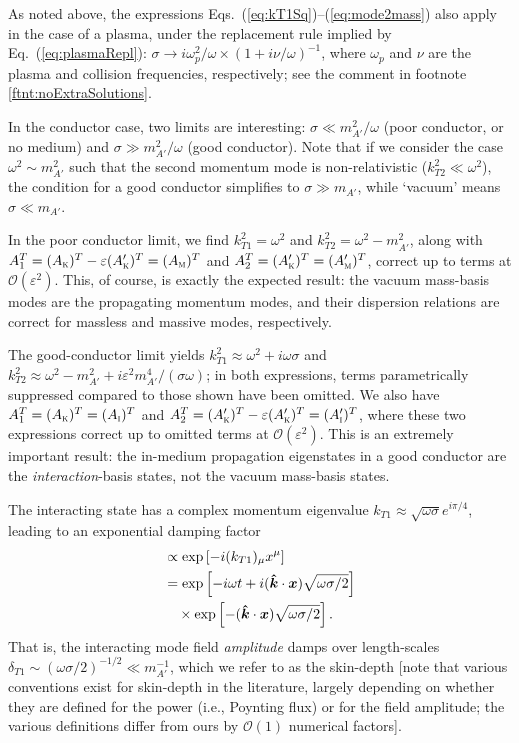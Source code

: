 \documentclass[amsmath,amssymb,aps,10pt,prd,letterpaper,nofootinbib,balancelastpage,notitlepage,superscriptaddress,twocolumn,floatfix]{revtex4-2}
\renewcommand{\eqref}[2][]{Eq{#1}.~(\ref{eq:#2})}	%
\newcommand{\eqrefRange}[2]{Eqs.~(\ref{eq:#1})--(\ref{eq:#2})}
\newcommand{\lb}{\ensuremath{\left}}					%
\newcommand{\rb}{\ensuremath{\right}}					%
\newcommand{\nl}{\nonumber \\ & \quad }					%
\newcommand{\kin}[1]{({#1}_{\textsc{k}})}
\newcommand{\primekin}[1]{({#1}_{\textsc{k}}^\prime)}
\newcommand{\mass}[1]{({#1}_{\textsc{m}})}
\newcommand{\primemass}[1]{({#1}_{\textsc{m}}^\prime)}
\newcommand{\inter}[1]{({#1}_{\textsc{i}})}
\newcommand{\primeinter}[1]{({#1}_{\textsc{i}}^\prime)}
\begin{document}
As noted above, the expressions \eqrefRange{kT1Sq}{mode2mass} also apply in the case of a plasma, under the replacement rule implied by \eqref{plasmaRepl}: $\sigma \rightarrow i \omega_p^2/\omega \times ( 1+i\nu/\omega )^{-1}$, where $\omega_p$ and $\nu$ are the plasma and collision frequencies, respectively; see the comment in footnote \ref{ftnt:noExtraSolutions}.

In the conductor case, two limits are interesting: $\sigma\ll m_{A'}^2/\omega $ (poor conductor, or no medium) and $\sigma \gg m_{A'}^2 / \omega$ (good conductor).
Note that if we consider the case $\omega^2 \sim m_{A'}^2$ such that the second momentum mode is non-relativistic ($k_{T2}^2 \ll \omega^2$), the condition for a good conductor simplifies to $\sigma \gg m_{A'}$, while `vacuum' means $\sigma \ll m_{A'}$.

In the poor conductor limit, we find $k_{T1}^2 = \omega^2$ and $k_{T2}^2 = \omega^2-m_{A'}^2$, along with $A_{1}^T = \kin{A}^T - \varepsilon \primekin{A}^T = \mass{A}^T$ and $A_{2}^T = \primekin{A}^T = \primemass{A}^T$, correct up to terms at $\mathcal{O}(\varepsilon^2)$.
This, of course, is exactly the expected result: the vacuum mass-basis modes are the propagating momentum modes, and their dispersion relations are correct for massless and massive modes, respectively.

The good-conductor limit yields $k_{T1}^2 \approx \omega^2 + i \omega \sigma$ and $k_{T2}^2 \approx \omega^2 - m_{A'}^2 + i \varepsilon^2 m_{A'}^4/(\sigma \omega)$; in both expressions, terms parametrically suppressed compared to those shown have been omitted.
We also have $A_{1}^T = \kin{A}^T = \inter{A}^T$ and $A_{2}^T = \primekin{A}^T - \varepsilon \primekin{A}^T = \primeinter{A}^T$, where these two expressions correct up to omitted terms at $\mathcal{O}(\varepsilon^2)$.
This is an extremely important result: the in-medium propagation eigenstates in a good conductor are the \emph{interaction}-basis states, not the vacuum mass-basis states.

The interacting state has a complex momentum eigenvalue $k_{T1} \approx \sqrt{\omega \sigma} e^{i\pi/4}$, leading to an exponential damping factor
\begin{align}
&\propto \exp\lb[- i (k_{T1})_\mu x^\mu\rb] \nonumber\\
&= \exp\lb[ - i\omega t + i (\bm{\hat{k}} \cdot \bm{x}) \sqrt{\omega \sigma / 2} \rb] \nl \times \exp\lb[  - (\bm{\hat{k}} \cdot \bm{x}) \sqrt{\omega \sigma / 2} \rb]. 
\end{align}
That is, the interacting mode field \emph{amplitude} damps over length-scales $\delta_{T1} \sim (\omega \sigma/2)^{-1/2} \ll m_{A'}^{-1}$, which we refer to as the skin-depth [note that various conventions exist for skin-depth in the literature, largely depending on whether they are defined for the power (i.e., Poynting flux) or for the field amplitude; the various definitions differ from ours by $\mathcal{O}(1)$ numerical factors].
\end{document}
